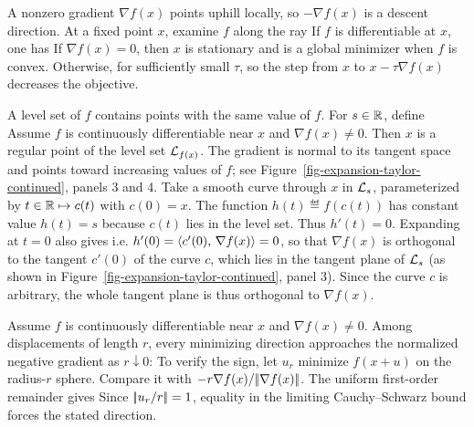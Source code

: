 A nonzero gradient $\nabla f(x)$ points uphill locally, so $-\nabla f(x)$ is a descent direction. At a fixed point $x$, examine $f$ along the ray
\eq{ 
	\tau \in \RR^+ = [0,+\infty[ \longmapsto f(x-\tau \nabla f(x)) \in \RR.
}
If $f$ is differentiable at $x$, one has 
If $\nabla f(x)=0$, then $x$ is stationary and is a global minimizer when $f$ is convex. Otherwise, for sufficiently small $\tau$,
so the step from $x$ to $x-\tau \nabla f(x)$ decreases the objective.

\begin{rem}
	A level set of $f$ contains points with the same value of $f$. For $s \in \mathbb{R}$, define
	Assume $f$ is continuously differentiable near $x$ and $\nabla f(x)\neq0$. Then $x$ is a regular point of the level set $\mathcal{L}_{f(x)}$. The gradient is normal to its tangent space and points toward increasing values of $f$; see Figure~\ref{fig-expansion-taylor-continued}, panels 3 and 4.
	Take a smooth curve through $x$ in $\mathcal{L}_s$, parameterized by $t \in \mathbb{R} \mapsto c(t)$ with $c(0)=x$.
	The function $h(t) \eqdef f(c(t))$ has constant value $h(t)=s$ because $c(t)$ lies in the level set. Thus $h'(t)=0$. Expanding at $t=0$ also gives
	i.e. $h'(0) = \langle c'(0),\,\nabla f(x)\rangle=0$, so that $\nabla f(x)$ is orthogonal to the tangent $c'(0)$ of the curve $c$, which lies in the tangent plane of $\mathcal{L}_s$  (as shown in Figure~\ref{fig-expansion-taylor-continued}, panel 3).  Since the curve $c$ is arbitrary, the whole tangent plane is thus orthogonal to $\nabla f(x)$.
\end{rem}

\begin{rem}
	Assume $f$ is continuously differentiable near $x$ and $\nabla f(x)\neq0$. Among displacements of length $r$, every minimizing direction approaches the normalized negative gradient as $r\downarrow0$:
To verify the sign, let $u_r$ minimize $f(x+u)$ on the radius-$r$ sphere. Compare it with $-r\nabla f(x)/|\!| \nabla f(x) |\!|$. The uniform first-order remainder gives
Since $|\!| u_r/r |\!|=1$, equality in the limiting Cauchy--Schwarz bound forces the stated direction.
\end{rem}



